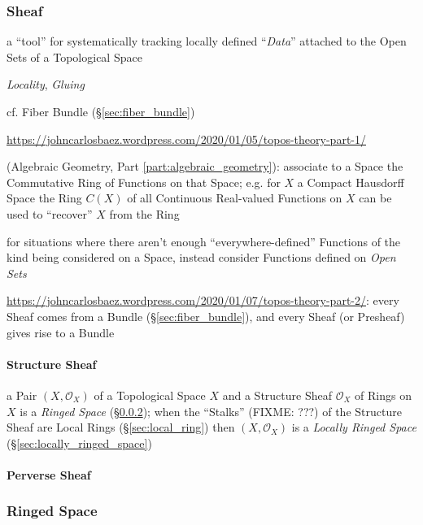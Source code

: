 \subsubsection{Sheaf}\label{sec:sheaf}

a ``tool'' for systematically tracking locally defined ``\emph{Data}'' attached
to the Open Sets of a Topological Space

\emph{Locality}, \emph{Gluing}

cf. Fiber Bundle (\S\ref{sec:fiber_bundle})

\url{https://johncarlosbaez.wordpress.com/2020/01/05/topos-theory-part-1/}

(Algebraic Geometry, Part \ref{part:algebraic_geometry}): associate to a Space
the Commutative Ring of Functions on that Space; e.g. for $X$ a Compact
Hausdorff Space the Ring $C(X)$ of all Continuous Real-valued Functions on $X$
can be used to ``recover'' $X$ from the Ring

for situations where there aren't enough ``everywhere-defined'' Functions of the
kind being considered on a Space, instead consider Functions defined on
\emph{Open Sets}

\url{https://johncarlosbaez.wordpress.com/2020/01/07/topos-theory-part-2/}:
every Sheaf comes from a Bundle (\S\ref{sec:fiber_bundle}), and every Sheaf (or
Presheaf) gives rise to a Bundle



\paragraph{Structure Sheaf}\label{sec:structure_sheaf}\hfill

a Pair $(X,\mathcal{O}_X)$ of a Topological Space $X$ and a Structure Sheaf
$\mathcal{O}_X$ of Rings on $X$ is a \emph{Ringed Space}
(\S\ref{sec:ringed_space});
when the ``Stalks'' (FIXME: ???) of the Structure Sheaf are Local Rings
(\S\ref{sec:local_ring}) then $(X,\mathcal{O}_X)$ is a \emph{Locally Ringed
  Space} (\S\ref{sec:locally_ringed_space})



\paragraph{Perverse Sheaf}\label{sec:perverse_sheaf}\hfill



\subsubsection{Ringed Space}\label{sec:ringed_space}

